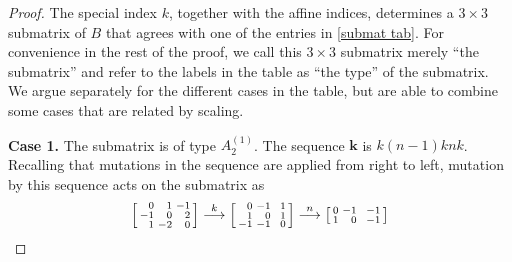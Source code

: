 \documentclass{amsart}
\theoremstyle{definition}
\theoremstyle{remark}
\numberwithin{equation}{section}
\newcommand{\0}{{\mathbf{0}}}
\newcommand{\kk}{\mathbf{k}}
\begin{document}
\begin{proof}
The special index $k$, together with the affine indices, determines a $3\times3$ submatrix of $B$ that agrees with one of the entries in \cref{submat tab}.
For convenience in the rest of the proof, we call this $3\times3$ submatrix merely ``the submatrix'' and refer to the labels in the table as ``the type'' of the submatrix.
We argue separately for the different cases in the table, but are able to combine some cases that are related by scaling.

\medskip

\noindent
\textbf{Case 1.}
The submatrix is of type $A_2^{(1)}$.
The sequence $\kk$ is $k(n-1)knk$.
Recalling that mutations in the sequence are applied from right to left, mutation by this sequence acts on the submatrix as
\begin{multline*}
\begin{bsmallmatrix*}[r]
0&1&-1\\
-1&0&2\\
1&-2&0
\end{bsmallmatrix*}
\overset{k}{\longrightarrow}
\begin{bsmallmatrix*}[r]
0&-1&\,\,\,1\\
1&0&1\\
-1&-1&0
\end{bsmallmatrix*}
\overset{n}{\longrightarrow}
\begin{bsmallmatrix*}[r]
0&-1&\,\,\,-1\\
1&0&-1\\

\end{bsmallmatrix*}
\end{multline*}
\end{proof}
\end{document}
